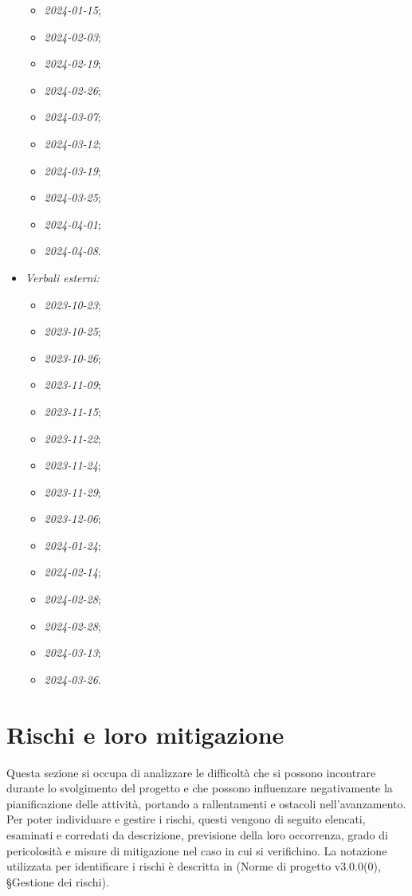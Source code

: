 \documentclass[10pt, a4paper]{article}
\begin{document}
\begin{itemize}
\begin{itemize}
        \item \textit{2024-01-15};
        \item \textit{2024-02-03};
        \item \textit{2024-02-19};
        \item \textit{2024-02-26};
        \item \textit{2024-03-07};
        \item \textit{2024-03-12};
        \item \textit{2024-03-19};
        \item \textit{2024-03-25};
        \item \textit{2024-04-01};
        \item \textit{2024-04-08}.
    \end{itemize}
    \item \textit{Verbali esterni:}
    \begin{itemize}
        \item \textit{2023-10-23};
        \item \textit{2023-10-25};
        \item \textit{2023-10-26};
        \item \textit{2023-11-09};
        \item \textit{2023-11-15};
        \item \textit{2023-11-22};
        \item \textit{2023-11-24};
        \item \textit{2023-11-29};
        \item \textit{2023-12-06};
        \item \textit{2024-01-24};
        \item \textit{2024-02-14};
        \item \textit{2024-02-28};
        \item \textit{2024-02-28};
        \item \textit{2024-03-13};
        \item \textit{2024-03-26}.
    \end{itemize}
\end{itemize}

\newpage

\section{Rischi e loro mitigazione}
\label{section:Rischi}
Questa sezione si occupa di analizzare le difficoltà che si possono incontrare durante lo svolgimento del progetto e che possono influenzare negativamente la pianificazione delle attività, portando a rallentamenti e ostacoli nell'avanzamento.\\
Per poter individuare e gestire i rischi, questi vengono di seguito elencati, esaminati e corredati da descrizione, previsione della loro occorrenza, grado di pericolosità e misure di mitigazione nel caso in cui si verifichino.
La notazione utilizzata per identificare i rischi è descritta in (Norme di progetto v3.0.0(0), \S Gestione dei rischi).
\end{document}
